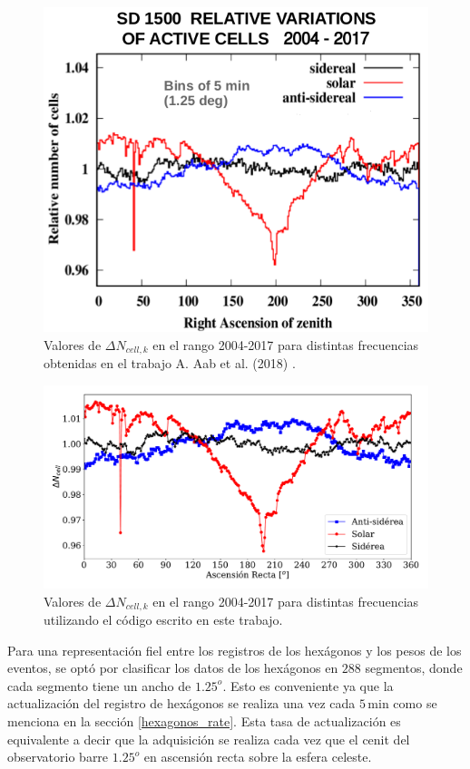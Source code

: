       \begin{figure}[H]
          \centering
              \includegraphics[width=0.6\linewidth]{pesos_referencia.png}  
              \caption{Valores de $\Delta N_{cell, k}$ en el rango 2004-2017 para distintas frecuencias obtenidas en el trabajo A. Aab et al. (2018) \cite{referencia_pesos}.}
              \label{fig:pesos_referencia}
        \end{figure}

       \begin{figure}[H]
          \centering
              \includegraphics[width=0.85\linewidth]{weigths_2004-2017.pdf}
              \caption{Valores de $\Delta N_{cell, k}$ en el rango 2004-2017 para distintas frecuencias utilizando el código escrito en este trabajo.}
              \label{fig:pesos_ejemplo}
        \end{figure}

    Para una representación fiel entre los registros de los hexágonos y los pesos de los eventos, se optó por clasificar los datos de los hexágonos en $288$ segmentos, donde cada segmento tiene un ancho de $1.25^o$. Esto es conveniente ya que la actualización del registro de hexágonos se realiza una vez  cada $5\,$min como se menciona en la sección \ref{hexagonos_rate}. Esta tasa de actualización es equivalente a decir que la adquisición se realiza cada vez que el cenit del observatorio barre  $1.25^o$ en ascensión recta sobre la esfera celeste.


